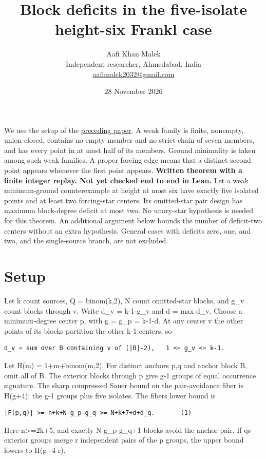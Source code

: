 \documentclass[11pt,letterpaper]{article}
\title{Block deficits in the five-isolate height-six Frankl case}
\author{Aafi Khan Malek\\ \small Independent researcher, Ahmedabad, India\\
\small\href{mailto:aafimalek2032@gmail.com}{aafimalek2032@gmail.com}}
\date{28 November 2026}
\begin{document}
\maketitle
We use the setup of the
\href{https://github.com/Aafimalek/novel-discoveries/tree/2d50235bd73e18b1c1371f96dd7fc3540514e0ee/frankl-height-six/verification/at-least-four-isolates}{preceding paper}.
A weak family is finite, nonempty, union-closed, contains no empty
member and no strict chain of seven members, and has every point
in at most half of its members. Ground minimality is taken among
such weak families. A proper forcing edge means that a distinct
second point appears whenever the first point appears.
\textbf{Written theorem with a finite integer replay. Not yet checked
end to end in Lean.} Let a weak minimum-ground counterexample at height
at most six have exactly five isolated points and at least two
forcing-star centers. Its omitted-star pair design has maximum
block-degree deficit at most two. No unary-star hypothesis is needed for
this theorem. An additional argument below bounds the number of
deficit-two centers without an extra hypothesis. General cases with
deficits zero, one, and two, and the single-source branch, are not
excluded.

\section*{Setup}\label{setup}

Let k count sources, Q = binom(k,2), N count omitted-star blocks, and
g\_v count blocks through v. Write d\_v = k-1-g\_v and d = max d\_v.
Choose a minimum-degree center p, with g = g\_p = k-1-d. At any center v
the other points of its blocks partition the other k-1 centers, so

\begin{verbatim}
d_v = sum over B containing v of (|B|-2),   1 <= g_v <= k-1.
\end{verbatim}

Let H(m) = 1+m+binom(m,2). For distinct anchors p,q and anchor block B,
omit all of B. The exterior blocks through p give g-1 groups of equal
occurrence signature. The sharp compressed Sauer bound on the
pair-avoidance fiber is H(g+4): the g-1 groups plus five isolates. The
fiber\textquotesingle s lower bound is

\begin{verbatim}
|F(p,q)| >= n+k+N-g_p-g_q >= N+k+7+d+d_q.       (1)
\end{verbatim}

Here n>=2k+5, and exactly N-g\_p-g\_q+1 blocks avoid the anchor pair. If
q\textquotesingle s exterior groups merge r independent pairs of the p
groups, the upper bound lowers to H(g+4-r).
\end{document}

